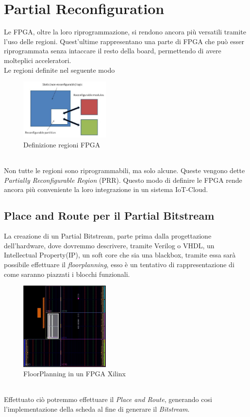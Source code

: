 \section{Partial Reconfiguration}
Le FPGA, oltre la loro riprogrammazione, si rendono ancora più versatili tramite l'uso delle regioni. Quest'ultime rappresentano una parte di FPGA che può esser riprogrammata senza intaccare il resto della board, permettendo di avere molteplici acceleratori.\\
Le regioni definite nel seguente modo
\begin{figure}
    \centering
    \includegraphics[width=0.4\textwidth]{images/PR1.png}
    \caption{Definizione regioni FPGA}
    \label{fig:my_label}
\end{figure}\\
Non tutte le regioni sono riprogrammabili, ma solo alcune. Queste vengono dette \textit{Partially Reconfigurable Region} (PRR). Questo modo di definire le FPGA rende ancora più conveniente la loro integrazione in un sistema IoT-Cloud.
\subsection{Place and Route per il Partial Bitstream}
La creazione di un Partial Bitstream, parte prima dalla progettazione dell'hardware, dove dovremmo descrivere, tramite Verilog o VHDL, un Intellectual Property(IP)\cite{PRRGIT}, un soft core che sia una blackbox, tramite essa sarà possibile effettuare il \textit{floorplanning}, esso è un tentativo di rappresentazione di come saranno piazzati i blocchi funzionali.
\begin{figure}
    \centering
    \includegraphics[width=0.4\textwidth]{images/Floor1.jpg}
    \caption{FloorPlanning in un FPGA Xilinx}
    \label{fig:my_label}
\end{figure}\\
Effettuato ciò potremmo effettuare il \textit{Place and Route}, generando cosi l'implementazione della scheda al fine di generare il \textit{Bitstream}\cite{PRR}. 
